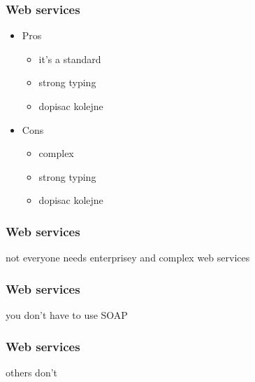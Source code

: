 \begin{frame}
  \frametitle{Web services}
  \begin{itemize}
  \item Pros
    \begin{itemize}
    \item it's a standard
    \item strong typing
    \item \alert{dopisac kolejne}
    \end{itemize}
  \item Cons
    \begin{itemize}
    \item complex
    \item strong typing
    \item \alert{dopisac kolejne}
    \end{itemize}
  \end{itemize}
\end{frame}

\begin{frame}
  \frametitle{Web services}
  \begin{center}
    not everyone needs enterprisey and complex web services
  \end{center}
\end{frame}

\begin{frame}
  \frametitle{Web services}
  \begin{center}
    you don't have to use SOAP
  \end{center}
\end{frame}

\begin{frame}
  \frametitle{Web services}
  \begin{center}
    others don't
  \end{center}
\end{frame}

